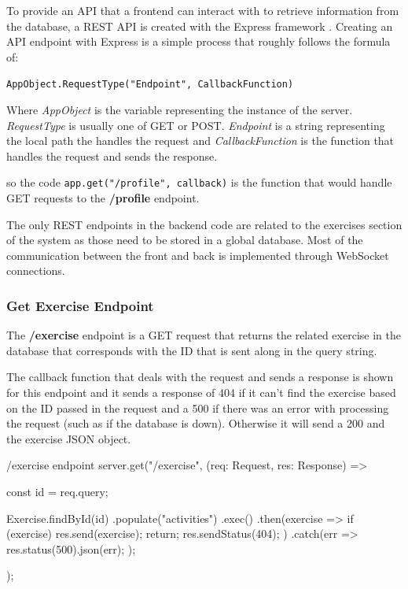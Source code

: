 To provide an API that a frontend can interact with to retrieve information from the database, a REST API is created with the Express framework \cite{express}. Creating an API endpoint with Express is a simple process that roughly follows the formula of:

\texttt{AppObject.RequestType("Endpoint", CallbackFunction)}

Where \textit{AppObject} is the variable representing the instance of the server. \textit{RequestType} is usually one of GET or POST. \textit{Endpoint} is a string representing the local path the handles the request and \textit{CallbackFunction} is the function that handles the request and sends the response.

so the code \texttt{app.get("/profile", callback)} is the function that would handle GET requests to the \textbf{/profile} endpoint. 

The only REST endpoints in the backend code are related to the exercises section of the system as those need to be stored in a global database. Most of the communication between the front and back is implemented through WebSocket connections.

\subsubsection{Get Exercise Endpoint}

The \textbf{/exercise} endpoint is a GET request that returns the related exercise in the database that corresponds with the ID that is sent along in the query string.

The callback function that deals with the request and sends a response is shown for this endpoint and it sends a response of 404 if it can't find the exercise based on the ID passed in the request and a 500 if there was an error with processing the request (such as if the database is down). Otherwise it will send a 200 and the exercise JSON object.

\begin{sexylisting}{/exercise endpoint}
server.get("/exercise", (req: Request, res: Response) => {
    const { id } = req.query;

    Exercise.findById(id)
        .populate("activities")
        .exec()
        .then(exercise => {
            if (exercise) {
                res.send(exercise);
                return;
            }
            res.sendStatus(404);
        })
        .catch(err => {
            res.status(500).json(err);
        });
});
\end{sexylisting}

